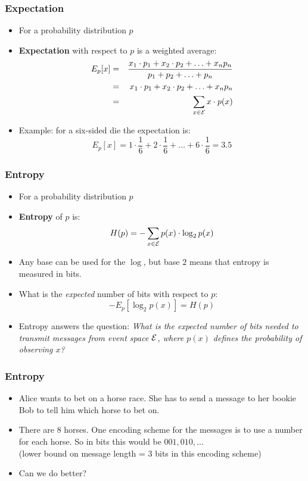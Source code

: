 \begin{frame}[fragile]
\frametitle{Expectation}
\begin{itemize}[<+->]
\item For a probability distribution $p$
\item \textbf{Expectation} with respect to $p$ is a weighted average:
\begin{eqnarray*}
 E_p[x] &=& \frac{x_1 \cdot p_1 + x_2 \cdot p_2 + \ldots + x_n p_n}{p_1 + p_2 + \ldots + p_n} \\
  &=& x_1 \cdot p_1 + x_2 \cdot p_2 + \ldots + x_n p_n \\
  &=& \sum_{x \in {\cal E}} x \cdot p(x) 
\end{eqnarray*}
\item Example: for a six-sided die the expectation is:
\[ E_p[x] = 1 \cdot \frac{1}{6} + 2 \cdot \frac{1}{6} + \ldots + 6 \cdot \frac{1}{6} = 3.5 \]
\end{itemize}

\end{frame}

\begin{frame}
\frametitle{Entropy}
\begin{itemize}[<+->]
\item For a probability distribution $p$
\item \textbf{Entropy} of $p$ is: 
\[ H(p) = - \sum_{x \in {\cal E}} p(x) \cdot \log_2 p(x) \]
\item Any base can be used for the $\log$, but base $2$ means
  that entropy is measured in bits.
\item What is the {\it expected} number of bits with respect to $p$:
\[ - E_p [ \log_2 p(x) ] = H(p) \]
\item Entropy answers the question: {\it What is the expected
  number of bits needed to transmit messages from event 
  space ${\cal E}$, where $p(x)$ defines the probability of observing $x$?} 
\end{itemize}

\end{frame}

\begin{frame}
\frametitle{Entropy}
\begin{itemize}[<+->]
\item Alice wants to bet on a horse race. She has to send a message to
  her bookie Bob to tell him which horse to bet on.
\item There are 8 horses. One encoding scheme for the messages is to
  use a number for each horse. So in bits this would be $001, 010,
  \ldots$\\
(lower bound on message length = 3 bits in this encoding scheme) 
\item Can we do better?
\end{itemize}

\end{frame}


